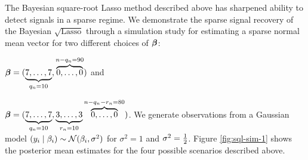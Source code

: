 \documentclass[12pt]{article}
\begin{document}
The Bayesian square-root Lasso method described above has sharpened ability to detect signals in a sparse regime. We demonstrate the sparse signal recovery of the Bayesian $\sqrt{\text{Lasso}}$ through a simulation study for estimating a sparse normal mean vector for two different choices of $\boldsymbol{\beta}$: 
\ben
\item $\boldsymbol{\beta} = (\underbrace{7,\ldots,7}_{q_n=10},\overbrace{0,\ldots,0}^{n-q_n = 90})$ and 
\item $\boldsymbol{\beta} = (\underbrace{7,\ldots,7}_{q_{n}=10},\underbrace{3,\ldots,3}_{r_n=10}\overbrace{0,\ldots,0}^{n-q_n-r_n = 80})$.
\een
We generate observations from a Gaussian model $(y_i \mid \beta_i) \sim \mathcal{N}(\beta_i, \sigma^2)$ for $\sigma^2 = 1$ and $\sigma^2 = \frac{1}{2}$. Figure \ref{fig:sql-sim-1} shows the posterior mean estimates for the four possible scenarios described above. 

%



\end{document}
